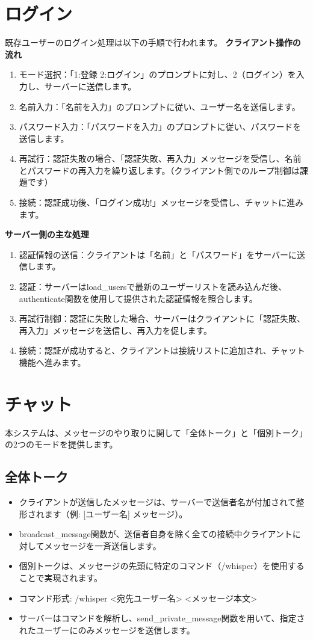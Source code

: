 \documentclass{article}
\begin{document}
\section{ログイン}
既存ユーザーのログイン処理は以下の手順で行われます。
\textbf{クライアント操作の流れ}
\begin{enumerate}
    \item モード選択：「1:登録 2:ログイン」のプロンプトに対し、2（ログイン）を入力し、サーバーに送信します。
    \item 名前入力：「名前を入力」のプロンプトに従い、ユーザー名を送信します。
    \item パスワード入力：「パスワードを入力」のプロンプトに従い、パスワードを送信します。
    \item 再試行：認証失敗の場合、「認証失敗、再入力」メッセージを受信し、名前とパスワードの再入力を繰り返します。（クライアント側でのループ制御は課題です）
    \item 接続：認証成功後、「ログイン成功!」メッセージを受信し、チャットに進みます。
\end{enumerate}
\textbf{サーバー側の主な処理}
\begin{enumerate}
    \item 認証情報の送信：クライアントは「名前」と「パスワード」をサーバーに送信します。
    \item 認証：サーバーはload\_usersで最新のユーザーリストを読み込んだ後、authenticate関数を使用して提供された認証情報を照合します。
    \item 再試行制御：認証に失敗した場合、サーバーはクライアントに「認証失敗、再入力」メッセージを送信し、再入力を促します。
    \item 接続：認証が成功すると、クライアントは接続リストに追加され、チャット機能へ進みます。
\end{enumerate}
\section{チャット}
本システムは、メッセージのやり取りに関して「全体トーク」と「個別トーク」の2つのモードを提供します。
\subsection{全体トーク}
\begin{itemize}
    \item クライアントが送信したメッセージは、サーバーで送信者名が付加されて整形されます（例: [ユーザー名] メッセージ）。
    \item broadcast\_message関数が、送信者自身を除く全ての接続中クライアントに対してメッセージを一斉送信します。
\end{itemize}
\begin{itemize}
    \item 個別トークは、メッセージの先頭に特定のコマンド（/whisper）を使用することで実現されます。
    \item コマンド形式: /whisper <宛先ユーザー名> <メッセージ本文>
    \item サーバーはコマンドを解析し、send\_private\_message関数を用いて、指定されたユーザーにのみメッセージを送信します。
\end{itemize}
\end{document}
